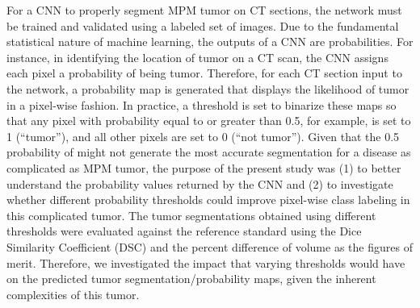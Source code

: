 \documentclass{article}
\begin{document}
For a CNN to properly segment MPM tumor on CT sections, the network must be trained and validated using a labeled set of images. Due to the fundamental statistical nature of machine learning, the outputs of a CNN are probabilities. For instance, in identifying the location of tumor on a CT scan, the CNN assigns each pixel a probability of being tumor. Therefore, for each CT section input to the network, a probability map is generated that displays the likelihood of tumor in a pixel-wise fashion. In practice, a threshold is set to binarize these maps so that any pixel with probability equal to or greater than 0.5, for example, is set to 1 (``tumor''), and all other pixels are set to 0 (``not tumor''). Given that the 0.5 probability of might not generate the most accurate segmentation for a disease as complicated as MPM tumor, the purpose of the present study was (1) to better understand the probability values returned by the CNN and (2) to investigate whether different probability thresholds could improve pixel-wise class labeling in this complicated tumor. The tumor segmentations obtained using different thresholds were evaluated against the reference standard using the Dice Similarity Coefficient (DSC) and the percent difference of volume as the figures of merit. Therefore, we investigated the impact that varying thresholds would have on the predicted tumor segmentation/probability maps, given the inherent complexities of this tumor. 


\end{document}
